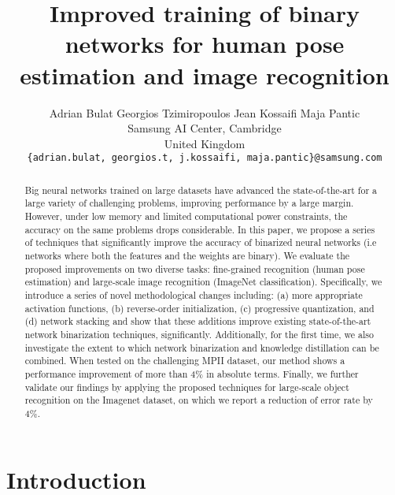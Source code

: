 \documentclass[10pt,twocolumn,letterpaper]{article}
\begin{document}
\title{Improved training of binary networks for human pose estimation and image recognition}

\author{Adrian Bulat  \qquad Georgios Tzimiropoulos \qquad Jean Kossaifi \qquad Maja Pantic
        \vspace{5pt}\\
		Samsung AI Center, Cambridge\\
		United Kingdom\\
		{\tt\small \{adrian.bulat, georgios.t, j.kossaifi, maja.pantic\}@samsung.com}
		}

\maketitle


\begin{abstract}

Big neural networks trained on large datasets have advanced the state-of-the-art for a large variety of challenging problems, improving performance by a large margin. However, under low memory and limited computational power constraints, the accuracy on the same problems drops considerable. In this paper, we propose a series of techniques that significantly improve the accuracy of binarized neural networks (i.e networks where both the features and the weights are binary). We evaluate the proposed improvements on two diverse tasks: fine-grained recognition (human pose estimation) and large-scale image recognition (ImageNet classification). 
Specifically, we introduce a series of novel methodological changes including: (a) more appropriate activation functions, (b) reverse-order initialization, (c) progressive quantization, and (d) network stacking and show that these additions improve existing state-of-the-art network binarization techniques, significantly. Additionally, for the first time, we also investigate the extent to which network binarization and knowledge distillation can be combined. When tested on the challenging MPII dataset, our method shows a performance improvement of more than 4\% in absolute terms. Finally, we further validate our findings by applying the proposed techniques for large-scale object recognition on the Imagenet dataset, on which we report a reduction of error rate by 4\%.





\end{abstract}

\section{Introduction}
\end{document}

